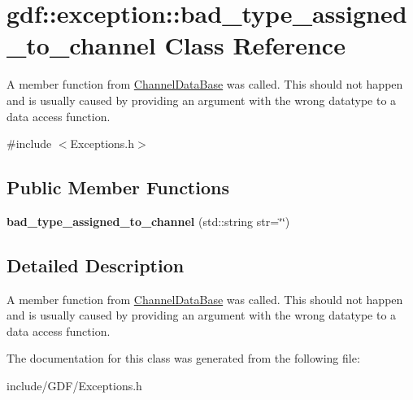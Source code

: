 \hypertarget{classgdf_1_1exception_1_1bad__type__assigned__to__channel}{
\section{gdf::exception::bad\_\-type\_\-assigned\_\-to\_\-channel Class Reference}
\label{classgdf_1_1exception_1_1bad__type__assigned__to__channel}
}


A member function from \hyperlink{classgdf_1_1_channel_data_base}{ChannelDataBase} was called. This should not happen and is usually caused by providing an argument with the wrong datatype to a data access function.  




{\ttfamily \#include $<$Exceptions.h$>$}

\subsection*{Public Member Functions}
\begin{DoxyCompactItemize}
\item 
\hypertarget{classgdf_1_1exception_1_1bad__type__assigned__to__channel_a60c322aa1ed352ce69e321cc87d0752d}{
{\bfseries bad\_\-type\_\-assigned\_\-to\_\-channel} (std::string str=\char`\"{}\char`\"{})}
\label{classgdf_1_1exception_1_1bad__type__assigned__to__channel_a60c322aa1ed352ce69e321cc87d0752d}

\end{DoxyCompactItemize}


\subsection{Detailed Description}
A member function from \hyperlink{classgdf_1_1_channel_data_base}{ChannelDataBase} was called. This should not happen and is usually caused by providing an argument with the wrong datatype to a data access function. 

The documentation for this class was generated from the following file:\begin{DoxyCompactItemize}
\item 
include/GDF/Exceptions.h\end{DoxyCompactItemize}
